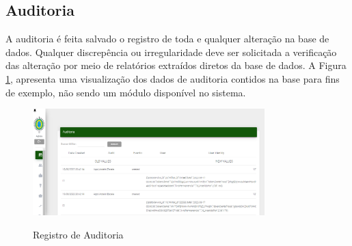 \subsection{Auditoria}

A auditoria é feita salvado o registro de toda e qualquer alteração na base de dados. Qualquer discrepência ou irregularidade deve ser solicitada a verificação das alteração por meio de relatórios extraídos diretos da base de dados. A Figura \ref{fig:auditoria}, apresenta uma visualização dos dados de auditoria contidos na base para fins de exemplo, não sendo um módulo disponível no sistema.

\begin{figure}[H]
    \centering
    \caption{Registro de Auditoria}
    \includegraphics[width=0.8\textwidth]{images/TELA DE AUTIDORIA.png}
    \label{fig:auditoria}
\end{figure}
